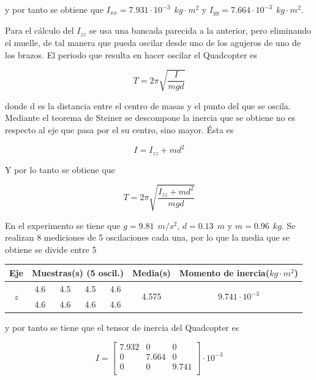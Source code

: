 \documentclass[twoside,11pt]{book}
\begin{document}
y por tanto se obtiene que $I_{xx}=7.931\cdot 10^{-3} \>\> kg \cdot m^{2}$ y $I_{yy}=7.664\cdot 10^{-3}\>\> kg \cdot m^{2}$.

Para el cálculo del $I_{zz}$ se usa una bancada parecida a la anterior, pero eliminando el muelle, de tal manera que pueda oscilar desde uno de los agujeros de uno de los brazos. El periodo que resulta en hacer oscilar el Quadcopter es 

\begin{equation}
T=2\pi \sqrt{\frac{I}{mgd}}
\end{equation}

donde d es la distancia entre el centro de masas y el punto del que se oscila. Mediante el teorema de Steiner se descompone la inercia que se obtiene no es respecto al eje que pasa por el su centro, sino mayor. Ésta es 

\begin{equation}
I=I_{zz}+md^{2}
\end{equation}

Y por lo tanto se obtiene que

\begin{equation}
T=2\pi \sqrt{\frac{I_{zz}+md^{2}}{mgd}}
\end{equation}

En el experimento se tiene que $g=9.81\>\>m/s^{2}$, $d=0.13\>\>m$ y $m=0.96\>\>kg$. Se realizan 8 mediciones de 5 oscilaciones cada una, por lo que la media que se obtiene se divide entre 5

\begin{center}
\begin{tabular}{|c|cccc|c|c|}
\hline
\textbf{Eje} & \multicolumn{4}{c|}{\textbf{Muestras}(s) (5 oscil.)} & \textbf{Media}(s) & \textbf{Momento de inercia}($kg \cdot m^{2}$) \\
\hline
\multirow{2}{*}{$z$} & 4.6 & 4.5 & 4.5 & 4.6 & \multirow{2}{*}{4.575} & \multirow{2}{*}{$9.741 \cdot 10^{-3}$} \\
& 4.6 & 4.6 & 4.6 & 4.6 & & \\
\hline
\end{tabular}
\end{center}
y por tanto se tiene que el tensor de inercia del Quadcopter es

\begin{equation}
I=\left[ \begin{array}{ccc}
7.932 & 0 & 0 \\
0 & 7.664 & 0 \\
0 & 0 & 9.741 \\
\end{array} \right] \cdot 10^{-3}
\end{equation}
\end{document}
